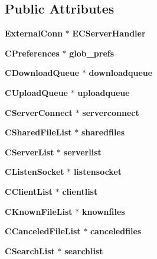 \subsection*{Public Attributes}
\begin{DoxyCompactItemize}
\item 
{\bf ExternalConn} $\ast$ {\bfseries ECServerHandler}\label{classCamuleApp_a8654010b1374b16542eb1ef49af7ecbe}

\item 
{\bf CPreferences} $\ast$ {\bfseries glob\_\-prefs}\label{classCamuleApp_acf79fdbc41b89b2b8cb8847e2c48789d}

\item 
{\bf CDownloadQueue} $\ast$ {\bfseries downloadqueue}\label{classCamuleApp_a00febd946b20be975950483073cfe76f}

\item 
{\bf CUploadQueue} $\ast$ {\bfseries uploadqueue}\label{classCamuleApp_a3840925803b0d51b81e8afcf8cb04afd}

\item 
{\bf CServerConnect} $\ast$ {\bfseries serverconnect}\label{classCamuleApp_ad52ad8dc34d9cdec0504301def33fbd0}

\item 
{\bf CSharedFileList} $\ast$ {\bfseries sharedfiles}\label{classCamuleApp_a0b2fa58ae3dd6fe93ba6552a2df6c389}

\item 
{\bf CServerList} $\ast$ {\bfseries serverlist}\label{classCamuleApp_a22816d0243e2b5c6e02de475c029d4ca}

\item 
{\bf CListenSocket} $\ast$ {\bfseries listensocket}\label{classCamuleApp_a2491e769ba680c4187491e5036c68ab8}

\item 
{\bf CClientList} $\ast$ {\bfseries clientlist}\label{classCamuleApp_a4b1cb6beaaea8791837cd7890a4e62e3}

\item 
{\bf CKnownFileList} $\ast$ {\bfseries knownfiles}\label{classCamuleApp_a116b10cc75f8269944bc088545875555}

\item 
{\bf CCanceledFileList} $\ast$ {\bfseries canceledfiles}\label{classCamuleApp_ae6aea7a63992ef19b1935e030182cf5c}

\item 
{\bf CSearchList} $\ast$ {\bfseries searchlist}\label{classCamuleApp_a99f12de8ed19df5525dfb6d1a9f7c1d7}


\end{DoxyCompactItemize}
